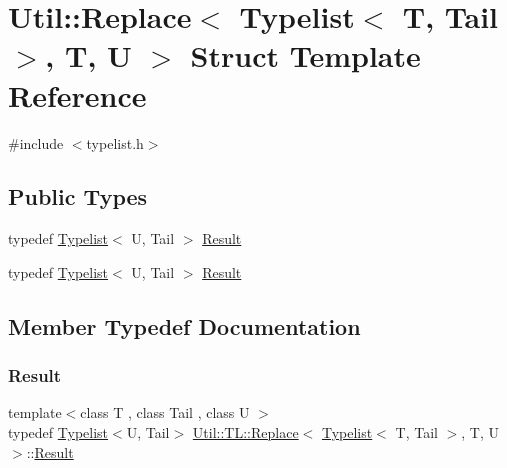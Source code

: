 \hypertarget{structUtil_1_1TL_1_1Replace_3_01Typelist_3_01T_00_01Tail_01_4_00_01T_00_01U_01_4}{}\section{Util\+:\+:Replace$<$ Typelist$<$ T, Tail $>$, T, U $>$ Struct Template Reference}
\label{structUtil_1_1TL_1_1Replace_3_01Typelist_3_01T_00_01Tail_01_4_00_01T_00_01U_01_4}


{\ttfamily \#include $<$typelist.\+h$>$}

\subsection*{Public Types}
\begin{DoxyCompactItemize}
\item 
typedef \mbox{\hyperlink{structUtil_1_1Typelist}{Typelist}}$<$ U, Tail $>$ \mbox{\hyperlink{structUtil_1_1TL_1_1Replace_3_01Typelist_3_01T_00_01Tail_01_4_00_01T_00_01U_01_4_a673e2d2a7c26a530c7015a04bde5a506}{Result}}
\item 
typedef \mbox{\hyperlink{structUtil_1_1Typelist}{Typelist}}$<$ U, Tail $>$ \mbox{\hyperlink{structUtil_1_1TL_1_1Replace_3_01Typelist_3_01T_00_01Tail_01_4_00_01T_00_01U_01_4_a673e2d2a7c26a530c7015a04bde5a506}{Result}}
\end{DoxyCompactItemize}


\subsection{Member Typedef Documentation}
\mbox{\label{structUtil_1_1TL_1_1Replace_3_01Typelist_3_01T_00_01Tail_01_4_00_01T_00_01U_01_4_a673e2d2a7c26a530c7015a04bde5a506}} 
\subsubsection{\texorpdfstring{Result}{Result}\hspace{0.1cm}{\footnotesize\ttfamily [1/2]}}
{\footnotesize\ttfamily template$<$class T , class Tail , class U $>$ \\
typedef \mbox{\hyperlink{structUtil_1_1Typelist}{Typelist}}$<$U, Tail$>$ \mbox{\hyperlink{structUtil_1_1TL_1_1Replace}{Util\+::\+T\+L\+::\+Replace}}$<$ \mbox{\hyperlink{structUtil_1_1Typelist}{Typelist}}$<$ T, Tail $>$, T, U $>$\+::\mbox{\hyperlink{structUtil_1_1TL_1_1Replace_3_01Typelist_3_01T_00_01Tail_01_4_00_01T_00_01U_01_4_a673e2d2a7c26a530c7015a04bde5a506}{Result}}}

